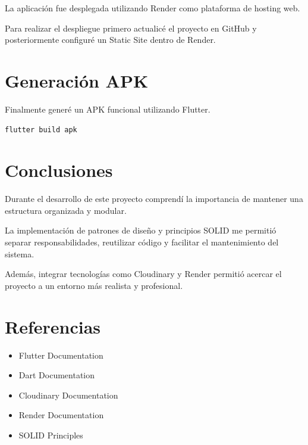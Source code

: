 \documentclass[12pt]{article}
\begin{document}
La aplicación fue desplegada utilizando Render como plataforma de hosting web.

Para realizar el despliegue primero actualicé el proyecto en GitHub y posteriormente configuré un Static Site dentro de Render.


\section{Generación APK}

Finalmente generé un APK funcional utilizando Flutter.

\begin{lstlisting}[language=bash]
flutter build apk
\end{lstlisting}


\section{Conclusiones}

Durante el desarrollo de este proyecto comprendí la importancia de mantener una estructura organizada y modular.

La implementación de patrones de diseño y principios SOLID me permitió separar responsabilidades, reutilizar código y facilitar el mantenimiento del sistema.

Además, integrar tecnologías como Cloudinary y Render permitió acercar el proyecto a un entorno más realista y profesional.


\section{Referencias}

\begin{itemize}
    \item Flutter Documentation
    \item Dart Documentation
    \item Cloudinary Documentation
    \item Render Documentation
    \item SOLID Principles
\end{itemize}
\end{document}
